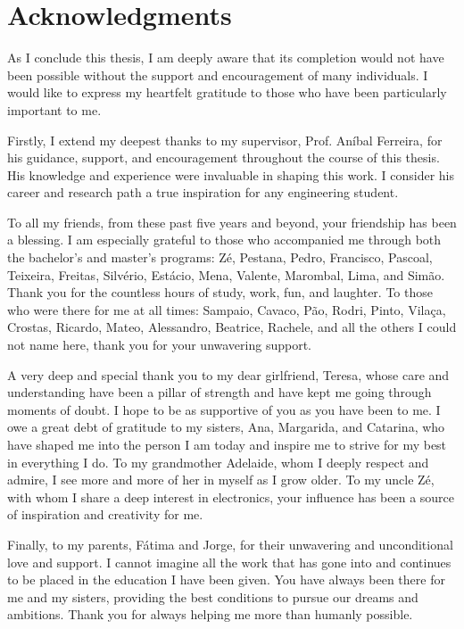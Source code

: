 \chapter*{Acknowledgments}

As I conclude this thesis, I am deeply aware that its completion would not have been possible without the support and encouragement of many individuals. I would like to express my heartfelt gratitude to those who have been particularly important to me.

Firstly, I extend my deepest thanks to my supervisor, Prof. Aníbal Ferreira, for his guidance, support, and encouragement throughout the course of this thesis. His knowledge and experience were invaluable in shaping this work. I consider his career and research path a true inspiration for any engineering student.

To all my friends, from these past five years and beyond, your friendship has been a blessing. I am especially grateful to those who accompanied me through both the bachelor's and master's programs: Zé, Pestana, Pedro, Francisco, Pascoal, Teixeira, Freitas, Silvério, Estácio, Mena, Valente, Marombal, Lima, and Simão. Thank you for the countless hours of study, work, fun, and laughter. To those who were there for me at all times: Sampaio, Cavaco, Pão, Rodri, Pinto, Vilaça, Crostas, Ricardo, Mateo, Alessandro, Beatrice, Rachele, and all the others I could not name here, thank you for your unwavering support.

A very deep and special thank you to my dear girlfriend, Teresa, whose care and understanding have been a pillar of strength and have kept me going through moments of doubt. I hope to be as supportive of you as you have been to me. I owe a great debt of gratitude to my sisters, Ana, Margarida, and Catarina, who have shaped me into the person I am today and inspire me to strive for my best in everything I do. To my grandmother Adelaide, whom I deeply respect and admire, I see more and more of her in myself as I grow older. To my uncle Zé, with whom I share a deep interest in electronics, your influence has been a source of inspiration and creativity for me.

Finally, to my parents, Fátima and Jorge, for their unwavering and unconditional love and support. I cannot imagine all the work that has gone into and continues to be placed in the education I have been given. You have always been there for me and my sisters, providing the best conditions to pursue our dreams and ambitions. Thank you for always helping me more than humanly possible.

\vspace{10mm}


